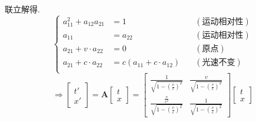     联立解得.
        \[\left\{\begin{array}{rll}
            a_{11}^2 + a_{12}a_{21} &= 1 &\quad (\text{运动相对性})\\
            a_{11} &= a_{22}  &\quad (\text{运动相对性})\\
            a_{21} + v·a_{22} &= 0 &\quad (\text{原点})\\
            a_{21} + c·a_{22} &= c(a_{11} + c·a_{12} ) &\quad (\text{光速不变})\\
        \end{array}\right.\]
        \[\Rightarrow \begin{bmatrix}t' \\ x'\end{bmatrix} = \boldsymbol A \begin{bmatrix}t \\ x\end{bmatrix} = \begin{bmatrix}
            \frac{1}{\sqrt{1-\left( \frac{v}{c} \right)^{2}}} & \frac{v}{\sqrt{1-\left( \frac{v}{c} \right)^{2}}}\\
            \frac{\frac{v}{c^{2}}}{\sqrt{1-\left( \frac{v}{c} \right)^{2}}} & \frac{1}{\sqrt{1-\left( \frac{v}{c} \right)^{2}}}
        \end{bmatrix} \begin{bmatrix}t \\ x\end{bmatrix}\]
